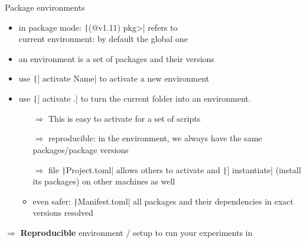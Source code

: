 \documentclass[aspectratio=169, 12pt]{beamer}
\begin{document}
    \begin{frame}{Package environments}
        \begin{itemize}
            \item in package mode: \texttt|(@v1.11) pkg>| refers to\\
            current environment: by default the global one
            \item an \alert{environment} is a set of packages and their versions
            \item use \texttt|] activate Name| to activate a new environment
            \item use \texttt|] activate .| to turn the current folder into an environment.
            \begin{itemize}[<+->]
                \item[$\Rightarrow$] This is easy to activate for a set of scripts
                \item[$\Rightarrow$] reproducible: in the environment,
                we always have the same packages/package versions
                \item[$\Rightarrow$] file \texttt|Project.toml| allows others to
                activate and \texttt|] instantiate| (install its packages) on other machines as well
                \item even safer: \texttt|Manifest.toml| all packages and their dependencies in \alert{exact versions} resolved
            \end{itemize}
        \end{itemize}
        \pause
        \alert{\textbf{$\Rightarrow$}} \textbf{Reproducible} environment / setup to run your experiments in
    \end{frame}
\end{document}
